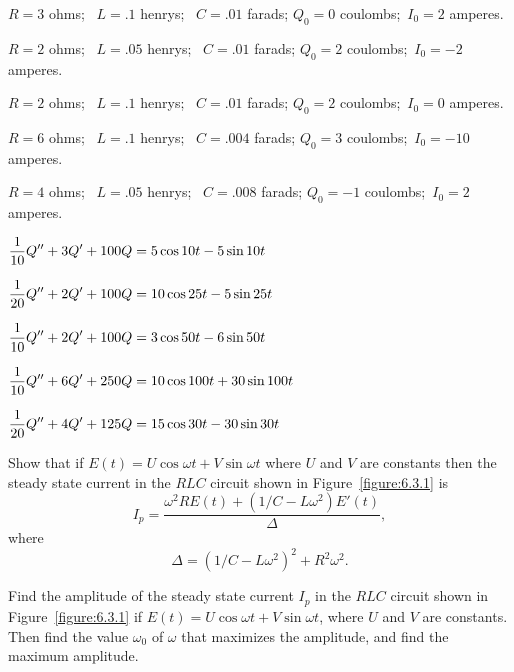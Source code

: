 \begin{exerciselist}
  \item\label{exer:6.3.1} $R=3$ ohms; \, $L=.1$ henrys; \, $C=.01$ farads; $Q_{0}=0$ coulombs;
        \,$I_{0}=2$ amperes.

  \item\label{exer:6.3.2} $R=2$ ohms; \, $L=.05$ henrys; \, $C=.01$ farads; $Q_{0}=2$ coulombs;
        \,$I_{0}=-2$ amperes.

  \item\label{exer:6.3.3} $R=2$ ohms; \, $L=.1$ henrys; \, $C=.01$ farads; $Q_{0}=2$ coulombs;
        \,$I_{0}=0$ amperes.

  \item\label{exer:6.3.4} $R=6$ ohms; \, $L=.1$ henrys; \, $C=.004$ farads; $Q_{0}=3$ coulombs;
        \,$I_{0}=-10$ amperes.

  \item\label{exer:6.3.5} $R=4$ ohms; \, $L=.05$ henrys; \, $C=.008$ farads; $Q_{0}=-1$ coulombs;
        \,$I_{0}=2$ amperes.


  \item\label{exer:6.3.6} $\displaystyle\frac{1}{10}Q''+3Q'+100Q=5\cos10t-5\sin10t$

  \item\label{exer:6.3.7} $\displaystyle\frac{1}{20}Q''+2Q'+100Q=10\cos25t-5\sin25t$

  \item\label{exer:6.3.8} $\displaystyle\frac{1}{10}Q''+2Q'+100Q=3\cos50t-6\sin50t$

  \item\label{exer:6.3.9} $\displaystyle\frac{1}{10}Q''+6Q'+250Q=10\cos100t+30\sin100t$

  \item\label{exer:6.3.10} $\displaystyle\frac{1}{20}Q''+4Q'+125Q=15\cos30t-30\sin30t$

  \item\label{exer:6.3.11} Show that if $E(t)=U\cos\omega t+V\sin\omega t$ where $U$ and $V$ are
        constants then the steady state current in the $RLC$ circuit shown in
        Figure~\ref{figure:6.3.1} is
  \[
    I_{p}=\frac{\omega^{2}RE(t)+(1/C-L\omega^{2})E'(t)}{\Delta},
  \]
  where
  \[
    \Delta=(1/C-L\omega^{2})^{2}+R^{2}\omega^{2}.
  \]

  \item\label{exer:6.3.12} Find the amplitude of the steady state current $I_{p}$ in the $RLC$
        circuit shown in Figure~\ref{figure:6.3.1} if $E(t)=U\cos\omega t+V\sin\omega t$, where $U$
        and $V$ are constants. Then find the value $\omega_{0}$ of $\omega$ that maximizes the amplitude,
        and find the maximum amplitude.


\end{exerciselist}
